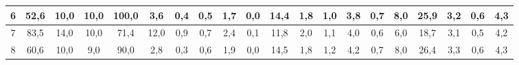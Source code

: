 \begin{sidewaystable}[]
\begin{tabular}{|c|c|c|c|c|c|c|c|c|c|c|c|c|c|c|c|c|c|c|c|}
    6  & 52,6                                            & 10,0                                            & 10,0                                            & 100,0                                           & 3,6                                             & 0,4                                             & 0,5                                             & 1,7                                             & 0,0                                             & 14,4                                             & 1,8                                              & 1,0                                              & 3,8                                              & 0,7                                              & 8,0                                              & 25,9                                             & 3,2                                              & 0,6                                              & 4,3                                              \\ \hline
    7  & 83,5                                            & 14,0                                            & 10,0                                            & 71,4                                            & 12,0                                            & 0,9                                             & 0,7                                             & 2,4                                             & 0,1                                             & 11,8                                             & 2,0                                              & 1,1                                              & 4,0                                              & 0,6                                              & 6,0                                              & 18,7                                             & 3,1                                              & 0,5                                              & 4,2                                              \\ \hline
    8  & 60,6                                            & 10,0                                            & 9,0                                             & 90,0                                            & 2,8                                             & 0,3                                             & 0,6                                             & 1,9                                             & 0,0                                             & 14,5                                             & 1,8                                              & 1,2                                              & 4,2                                              & 0,7                                              & 8,0                                              & 26,4                                             & 3,3                                              & 0,6                                              & 4,3                                              \\ \hline

\end{tabular}
\end{sidewaystable}
